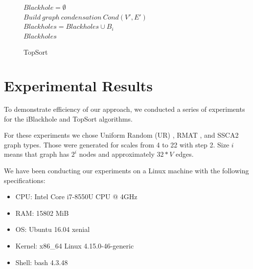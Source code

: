 \documentclass{svproc}
\begin{document}
\begin{figure}[H]
	\begin{center}
		\begin{algorithm}[H]
			\SetAlgoLined
                        
                        $Blackhole = \emptyset$\\
                        $Build\ graph\ condensation\ Cond(V',E')$\\
                         {
                             {
                                 {
                                     {
                                        $Blackholes = Blackholes \cup B_i$ \\
                                    }
                                }
                            }
                        }
                        \Return $Blackholes$
			\label{alg:topsort}
			\caption{TopSort}
		\end{algorithm}
	\end{center}
\end{figure}

%
\section{Experimental Results}

To demonstrate efficiency of our approach, we conducted a series of experiments for the iBlackhole and TopSort algorithms. 


For these experiments we chose Uniform Random (UR) \cite{random-uniform}, RMAT \cite{chakrabarti2004r},  and SSCA2 \cite{bader2005design} graph types. Those were generated for scales from 4 to 22
with step 2. Size $i$ means that graph has $2^i$ nodes and approximately $32*V$ edges. 

We have been conducting our experiments on a Linux machine with the following specifications:
\begin{itemize}
    \item CPU: Intel Core i7-8550U CPU @ 4GHz
    \item RAM: 15802 MiB
    \item OS: Ubuntu 16.04 xenial
    \item Kernel: x86\_64 Linux 4.15.0-46-generic
    \item Shell: bash 4.3.48
\end{itemize}
\end{document}
